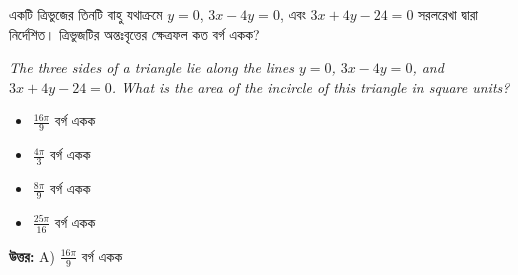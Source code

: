 \documentclass[12pt, a4paper]{article}
\begin{document}
\begin{tcolorbox}[questionbox={প্রশ্ন (Question) 40}]
    \noindent
    একটি ত্রিভুজের তিনটি বাহু যথাক্রমে $y = 0$, $3x - 4y = 0$, এবং $3x + 4y - 24 = 0$ সরলরেখা দ্বারা নির্দেশিত। ত্রিভুজটির অন্তঃবৃত্তের ক্ষেত্রফল কত বর্গ একক?
    
    \vspace{0.8em}
    \begin{english}
    \noindent\textit{\color{darkgray}
    The three sides of a triangle lie along the lines $y = 0$, $3x - 4y = 0$, and $3x + 4y - 24 = 0$. What is the area of the incircle of this triangle in square units?
    }
    \end{english}
\end{tcolorbox}

\begin{itemize}[label={}, leftmargin=1cm, itemsep=0.5em]
    \item[\textbf{A)}] $\frac{16\pi}{9}$ বর্গ একক
    \item[\textbf{B)}] $\frac{4\pi}{3}$ বর্গ একক
    \item[\textbf{C)}] $\frac{8\pi}{9}$ বর্গ একক
    \item[\textbf{D)}] $\frac{25\pi}{16}$ বর্গ একক
\end{itemize}

\vspace{0.5em}
\begin{tcolorbox}[answerbox]
    \textbf{\color{success} উত্তর:} A) $\frac{16\pi}{9}$ বর্গ একক
\end{tcolorbox}
\vspace{1em}
\end{document}
